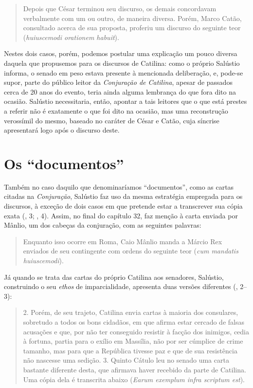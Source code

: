 \begin{quote} Depois que César terminou seu discurso, os demais concordavam
  verbalmente com um ou outro, de maneira diversa. Porém, Marco Catão,
  consultado acerca de sua proposta, proferiu um discurso do seguinte teor
  (\emph{huiuscemodi orationem habuit}).  \end{quote} Nestes dois casos, porém,
  podemos postular uma explicação um pouco diversa daquela que propusemos para
  os discursos de Catilina: como o próprio Salústio informa, o senado em peso
  estava presente à mencionada deliberação, e, pode-se supor, parte do público
  leitor da \emph{Conjuração de Catilina}, apesar de passados cerca de 20 anos
  do evento, teria ainda alguma lembrança do que fora dito na ocasião. Salústio
  necessitaria, então, apontar a tais leitores que o que está prestes a referir
  não é exatamente o que foi dito na ocasião, mas uma reconstrução verossímil
  do mesmo, baseado no caráter de César e Catão, cuja síncrise apresentará logo
  após o discurso deste.  


\section{Os “documentos''}

 Também no caso daquilo que denominaríamos  “documentos”, como as cartas
 citadas na \emph{Conjuração}, Salústio faz uso da mesma estratégia empregada
 para os discursos, à exceção de dois casos em que pretende estar a transcrever
 sua cópia exata (, 3; , 4). Assim, no final do capítulo 32, faz menção à
 carta enviada por Mânlio, um dos cabeças da conjuração, com as seguintes
 palavras: \begin{quote} Enquanto isso ocorre em Roma, Caio Mânlio manda a
 Márcio Rex enviados de seu contingente com ordens do seguinte teor (\emph{cum
 mandatis huiuscemodi}).  \end{quote} Já quando se trata das cartas do próprio
 Catilina aos senadores, Salústio, construindo o seu \emph{ethos} de
 imparcialidade, apresenta duas versões diferentes (, 2--3): \begin{quote} 2.
   Porém, de seu trajeto, Catilina envia cartas à maioria dos consulares,
   sobretudo a todos os bons cidadãos, em que afirma estar cercado de falsas
   acusações e que, por não ter conseguido resistir à facção dos inimigos,
   cedia à fortuna, partia para o exílio em Massília, não por ser cúmplice de
   crime tamanho, mas para que a República tivesse paz e que de sua resistência
   não nascesse uma sedição. 3. Quinto Cátulo leu no senado uma carta bastante
   diferente desta, que afirmava haver recebido da parte de Catilina. Uma cópia
   dela é transcrita abaixo (\emph{Earum exemplum infra scriptum est}).
 \end{quote}

